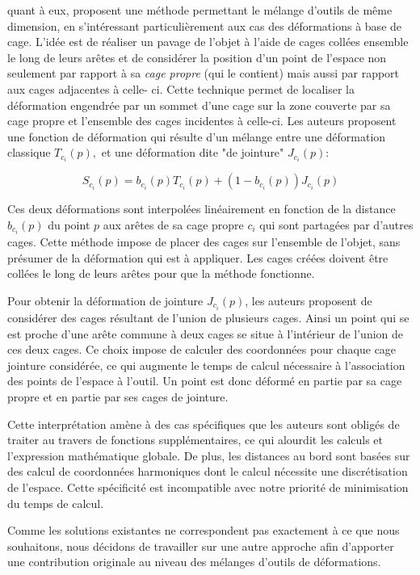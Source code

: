 \cite{GPCP13} quant à eux, proposent une méthode permettant le mélange
d'outils de même dimension, en s'intéressant particulièrement aux cas des
déformations à base de cage. L'idée est de réaliser un pavage de l'objet à
l'aide de cages collées ensemble le long de leurs arêtes et de considérer la
position d'un point de l'espace non seulement par rapport à sa \textit{cage
propre} (qui le contient) mais aussi par rapport aux cages adjacentes à celle-
ci. Cette technique permet de localiser la déformation engendrée par un sommet
d'une cage sur la zone couverte par sa cage propre et l'ensemble des cages
incidentes à celle-ci. Les auteurs proposent une fonction de déformation qui
résulte d'un mélange entre une déformation classique $T_{c_i}(p),$ et une
déformation dite "de jointure" $J_{c_i}(p)$:

\begin{equation}
  S_{c_i}(p) = b_{c_i}(p) T_{c_i}(p) + (1-b_{c_i}(p)) J_{c_i}(p)
\end{equation}

Ces deux déformations sont interpolées linéairement en fonction de la distance
$b_{c_i}(p)$ du point $p$ aux arêtes de sa cage propre $c_i$  qui
sont partagées par d'autres cages. Cette méthode impose de placer des cages
sur l'ensemble de l'objet, sans présumer de la déformation qui est à
appliquer. Les cages créées doivent être collées le long de leurs arêtes pour
que la méthode fonctionne.

Pour obtenir la déformation de jointure $J_{c_i}(p)$, les auteurs proposent de
considérer des cages résultant de l'union de plusieurs cages. Ainsi un point
qui se est proche d'une arête commune à deux cages se situe à l'intérieur de
l'union de ces deux cages. Ce choix impose de calculer des coordonnées pour
chaque cage jointure considérée, ce qui augmente le temps de calcul nécessaire
à l'association des points de l'espace à l'outil. Un point est donc déformé en
partie par sa cage propre et en partie par ses cages de jointure.

Cette interprétation amène à des cas spécifiques que les auteurs sont obligés
de traiter au travers de fonctions supplémentaires, ce qui alourdit les
calculs et l'expression mathématique globale. De plus, les distances au bord
sont basées sur des calcul de coordonnées harmoniques dont le calcul nécessite une
discrétisation de l'espace. Cette spécificité est incompatible avec notre
priorité de minimisation du temps de calcul.

Comme les solutions existantes ne correspondent pas exactement à ce que nous
souhaitons, nous décidons de travailler sur une autre approche afin
d'apporter une contribution originale au niveau des mélanges d'outils de
déformations. 

